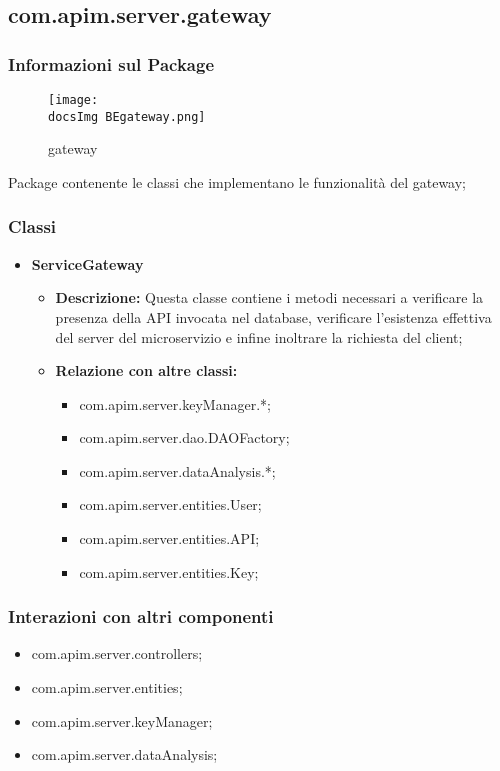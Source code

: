 {{  \subsection{com.apim.server.gateway}{
    \subsubsection{Informazioni sul Package}
      \begin{figure}[H]
        \centering
        \texttt{[image: \\docsImg BEgateway.png]}
        \caption{gateway}
        \label{gateway}
      \end{figure}
      Package  contenente le classi che implementano le funzionalità del gateway;
      \subsubsection{Classi}
      \begin{itemize} \itemsep1pt
      \item \textbf{ServiceGateway}
      \begin{itemize}
      \item \textbf{Descrizione:} Questa classe contiene i metodi necessari a verificare la presenza della API invocata nel database, verificare l'esistenza effettiva del server del microservizio e infine inoltrare la richiesta del client;
      \item \textbf{Relazione con altre classi:}
      \begin{itemize}
      \item com.apim.server.keyManager.*;
      \item com.apim.server.dao.DAOFactory;
      \item com.apim.server.dataAnalysis.*;
      \item com.apim.server.entities.User;
      \item com.apim.server.entities.API;
      \item com.apim.server.entities.Key;
      \end{itemize}
      \end{itemize}
      \end{itemize}
      \subsubsection{Interazioni con altri componenti}
      \begin{itemize}
      \item com.apim.server.controllers;
      \item com.apim.server.entities;
      \item com.apim.server.keyManager;
      \item com.apim.server.dataAnalysis;
      \end{itemize}
  }
}}
